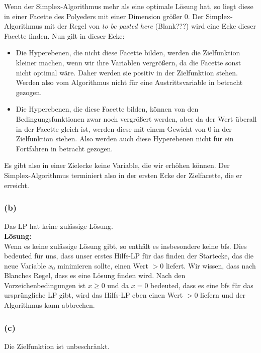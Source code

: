 \documentclass[11pt,a4paper,ngerman]{article}
\begin{document}
Wenn der Simplex-Algorithmus mehr als eine optimale Lösung hat, so liegt diese in einer Facette des Polyeders mit einer
Dimension größer $0$. Der Simplex-Algorithmus mit der Regel von \emph{to be pasted here} (Blank???) wird eine
Ecke dieser Facette finden.
Nun gilt in dieser Ecke:
\begin{itemize}
    \item Die Hyperebenen, die nicht diese Facette bilden, werden die Zielfunktion kleiner machen, wenn
        wir ihre Variablen vergrößern, da die Facette sonst nicht optimal wäre. 
        Daher werden sie positiv in der Zielfunktion stehen. Werden also vom Algorithmus nicht für
        eine Austrittsvariable in betracht gezogen.\\
    \item Die Hyperebenen, die diese Facette bilden, können von den Bedingungsfunktionen zwar
        noch vergrößert werden, aber da der Wert überall in der Facette gleich ist, werden
        diese mit einem Gewicht von $0$ in der Zielfunktion stehen. Also werden auch
        diese Hyperebenen nicht für ein Fortfahren in betracht gezogen.
\end{itemize}
Es gibt also in einer Zielecke keine Variable, die wir erhöhen können. Der Simplex-Algorithmus terminiert
also in der ersten Ecke der Zielfacette, die er erreicht.

\subsubsection*{(b)}
Das LP hat keine zulässige Lösung.\\

\textbf{Lösung:}\\

Wenn es keine zulässige Lösung gibt, so enthält es insbesondere keine bfs.
Dies bedeuted für uns, dass unser erstes Hilfs-LP für das finden der Startecke,
das die neue Variable $x_0$ minimieren sollte, einen Wert $>0$ liefert. Wir wissen,
dass nach Blanches Regel, dass es eine Lösung finden wird. Nach den Vorzeichenbedingungen
ist $x \geq 0$ und da $x=0$ bedeuted, dass es eine bfs für das ursprüngliche LP gibt,
wird das Hilfs-LP eben einen Wert $>0$ liefern und der Algorithmus kann abbrechen.

\subsubsection*{(c)}
Die Zielfunktion ist unbeschränkt.\\
\end{document}
